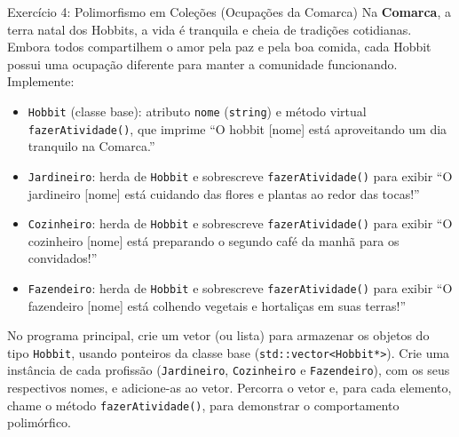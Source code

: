 \begin{exercicioCpp}{Exercício 4: Polimorfismo em Coleções (Ocupações da Comarca)}
Na \textbf{Comarca}, a terra natal dos Hobbits, a vida é tranquila e cheia de tradições
cotidianas. Embora todos compartilhem o amor pela paz e pela boa comida, cada Hobbit possui uma
ocupação diferente para manter a comunidade funcionando. Implemente:

\begin{itemize}
    \item \texttt{Hobbit} (classe base): atributo \texttt{nome} (\texttt{string}) e método
    virtual \texttt{fazerAtividade()}, que imprime ``O hobbit [nome] está aproveitando um dia
    tranquilo na Comarca.''

    \item \texttt{Jardineiro}: herda de \texttt{Hobbit} e sobrescreve
    \texttt{fazerAtividade()} para exibir ``O jardineiro [nome] está cuidando das flores e
    plantas ao redor das tocas!''

    \item \texttt{Cozinheiro}: herda de \texttt{Hobbit} e sobrescreve
    \texttt{fazerAtividade()} para exibir ``O cozinheiro [nome] está preparando o segundo café
    da manhã para os convidados!''

    \item \texttt{Fazendeiro}: herda de \texttt{Hobbit} e sobrescreve
    \texttt{fazerAtividade()} para exibir ``O fazendeiro [nome] está colhendo vegetais e
    hortaliças em suas terras!''
\end{itemize}

No programa principal, crie um vetor (ou lista) para armazenar os objetos do tipo
\texttt{Hobbit}, usando ponteiros da classe base (\texttt{std::vector<Hobbit*>}). Crie uma
instância de cada profissão (\texttt{Jardineiro}, \texttt{Cozinheiro} e \texttt{Fazendeiro}),
com os seus respectivos nomes, e adicione-as ao vetor. Percorra o vetor e, para cada elemento,
chame o método \texttt{fazerAtividade()}, para demonstrar o comportamento polimórfico.
\end{exercicioCpp}
